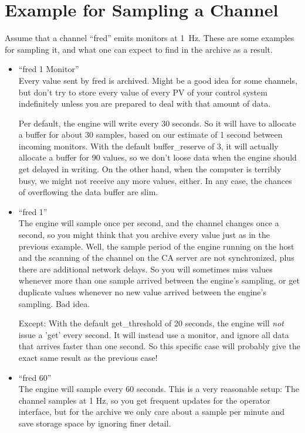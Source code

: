 \section{Example for Sampling a Channel}
Assume that a channel ``fred'' emits monitors at 1~Hz.
These are some examples for sampling it, and what one can expect to
find in the archive as a result.
\begin{itemize}
\item ``fred 1 Monitor''\\
      Every value sent by fred is archived. Might be a good idea for
      some channels, but don't try to store every value of every PV
      of your control system indefinitely unless you are prepared to
      deal with that amount of data.

      Per default, the engine will write every 30 seconds. So it will
      have to allocate a buffer for about 30 samples, based on our
      estimate of 1 second between incoming monitors.
      With the default buffer\_reserve of 3, it will actually allocate
      a buffer for 90 values, so we don't loose data when the engine
      should get delayed in writing. On the other hand, when the
      computer is terribly busy, we might not receive any more values,
      either. In any case, the chances of overflowing the data buffer
      are slim.
\item ``fred 1''\\
      The engine will sample once per second, and the channel changes
      once a second, so you might think that you archive every value
      just as in the previous example.  Well, the sample period of the
      engine running on the host and the scanning of the channel on
      the CA server are not synchronized, plus there are additional
      network delays. So you will sometimes miss values whenever more
      than one sample arrived between the engine's sampling, or get
      duplicate values whenever no new value arrived between the
      engine's sampling. Bad idea.

      Except: With the default get\_threshold of 20 seconds, the engine
      will \emph{not} issue a 'get' every second. It will instead use a
      monitor, and ignore all data that arrives faster than one
      second. So this specific case will probably give the exact same result
      as the previous case!
\item ``fred 60''\\
      The engine will sample every 60 seconds. This is a very
      reasonable setup: The channel samples at 1 Hz, so you get
      frequent updates for the operator interface, but for the archive
      we only care about a sample per minute and save storage space by
      ignoring finer detail.


\end{itemize}
